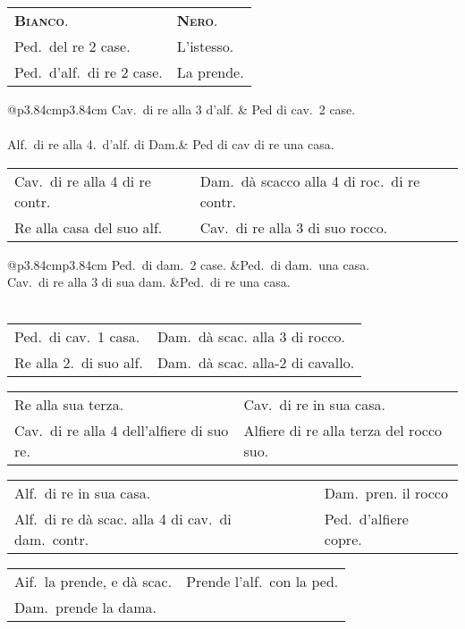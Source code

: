 \documentclass[11pt,a6paper]{article}
\newcommand{\markerA}{{\small$\Downarrow$}}
\newcommand{\markerB}{{\small$\downdownarrows$}}
\begin{document}
{\small\noindent\begin{tabular}{@{}p{3.84cm}p{3.84cm}}
 {\bfseries\scshape Bianco}. &{\bfseries\scshape Nero}.\\
 Ped.\ del re 2 case.& L'istesso.\\
 Ped.\ d'alf.\ di re 2 case. &La prende.\\
\end{tabular}

\noindent\begin{tabular}{@{}p{3.84cm}p{3.84cm}}
Cav.\ di re alla 3 d'alf. & Ped di cav.\ 2 case. \\
\multicolumn{2}{@{}c}{\markerA}\\
Alf.\ di re alla 4.\ d'alf. di Dam.& Ped di cav di re una casa. \\
 \end{tabular}

\noindent\begin{tabular}{@{}p{3.84cm}p{3.84cm}}
Cav.\ di re alla 4 di re contr. & Dam.\ dà scacco alla 4 di roc.\ di re contr. \\
Re alla casa del suo alf. & Cav.\ di re alla 3 di suo rocco.\\
 \end{tabular}

\noindent\begin{tabular}{@{}p{3.84cm}p{3.84cm}}
Ped.\ di dam.\ 2 case. &Ped.\ di dam.\ una casa. \\
Cav.\ di re alla 3 di sua dam. &Ped.\ di re una casa. \\
\multicolumn{2}{@{}c}{\markerB}\\
\end{tabular}

\noindent\begin{tabular}{@{}p{3.84cm}p{3.84cm}}
Ped.\ di cav.\ 1 casa.&Dam.\ dà scac. alla 3 di rocco.\\
Re alla 2.\ di suo alf. &Dam.\ dà scac. alla-2 di cavallo. \\
 \end{tabular}

\noindent\begin{tabular}{@{}p{3.84cm}p{3.84cm}}
Re alla sua terza. &Cav.\ di re in sua casa.\\
Cav.\ di re alla 4 dell'alfiere di suo re. &Alfiere di re alla terza del rocco suo.\\
 \end{tabular}

\noindent\begin{tabular}{@{}p{3.84cm}p{3.84cm}}
Alf.\ di re in sua casa. &Dam.\ pren. il rocco\\
Alf.\ di re dà scac. alla 4 di cav.\ di dam.\ contr. &Ped.\ d'alfiere copre.\\
 \end{tabular}

\noindent\begin{tabular}{@{}p{3.84cm}p{3.84cm}}
Aif.\ la prende, e dà scac. &Prende l'alf.\ con la ped.\\
Dam.\ prende la dama. &
\end{tabular}}
\end{document}
